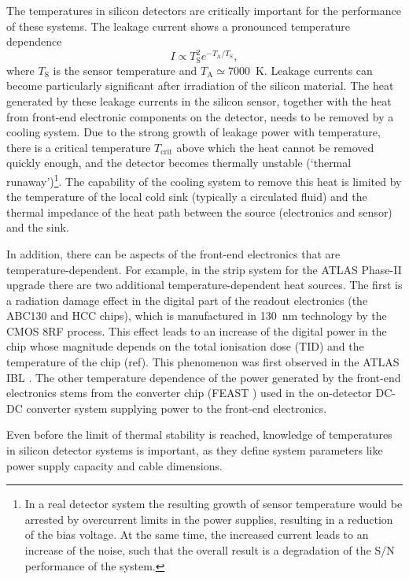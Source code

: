 The temperatures in silicon detectors are critically important for the performance of these systems. The leakage current shows a pronounced temperature dependence 
\begin{equation}
I\propto T_\text{S}^2e^{-T_\text{A}/T_\text{S}},
\label{eq:leakage_current_temp_dependence}
\end{equation}
where $T_\text{S}$ is the sensor temperature and $T_\text{A}\simeq7000$~K. Leakage currents can become particularly significant after irradiation of the silicon material. The heat generated by these leakage currents in the silicon sensor, together with the heat from front-end electronic components on the detector, needs to be removed by a cooling system. Due to the strong growth of leakage power with temperature, there is a critical temperature $T_\text{crit}$ above which the heat cannot be removed quickly enough, and the detector becomes thermally unstable (`thermal runaway')\footnote{In a real detector system the resulting growth of sensor temperature would be arrested by overcurrent limits in the power supplies, resulting in a reduction of the bias voltage. At the same time, the increased current leads to an increase of the noise, such that the overall result is a degradation of the S/N performance of the system.}. The capability of the cooling system to remove this heat is limited by the temperature of the local cold sink (typically a circulated fluid) and the thermal impedance of the heat path between the source (electronics and sensor) and the sink.

In addition, there can be aspects of the front-end electronics that are temperature-dependent. For example, in the strip system for the ATLAS Phase-II upgrade \cite{Collaboration:2017mtb} there are two additional temperature-dependent heat sources. The first is a radiation damage effect in the digital part of the readout electronics (the ABC130 \cite{abc130} and HCC chips), which is manufactured in 130~nm technology by the CMOS 8RF process. This effect leads to an increase of the digital power in the chip whose magnitude depends on the total ionisation dose (TID) and the temperature of the chip (ref). This phenomenon was first observed in the ATLAS IBL \cite{ATL-INDET-PUB-2017-001}. The other temperature dependence of the power generated by the front-end electronics stems from the converter chip (FEAST \cite{1748-0221-6-11-C11035}) used in the on-detector DC-DC converter system supplying power to the front-end electronics. 

Even before the limit of thermal stability is reached, knowledge of temperatures in silicon detector systems is important, as they define system parameters like power supply capacity and cable dimensions.

